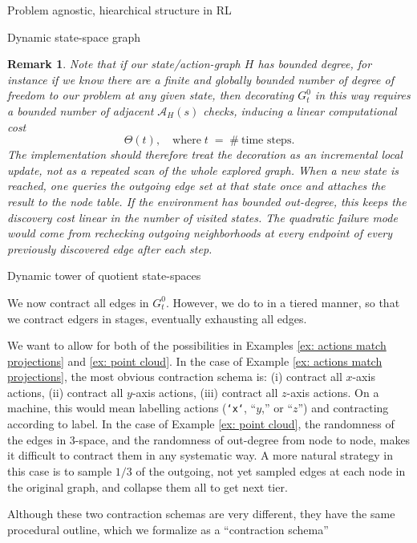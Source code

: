 \documentclass[11pt]{article}
\newtheorem{remark}[subsubsection]{Remark}
\begin{document}
\begin{section}{Problem agnostic, hiearchical structure in RL}
\begin{subsection}{Dynamic state-space graph}
\begin{remark}
\normalfont
Note that if our state/action-graph $H$ has bounded degree, for instance if we know there are a finite and globally bounded number of degree of freedom to our problem at any given state, then decorating $G^{0}_{t}$ in this way requires a bounded number of adjacent $\mathcal{A}_{H}(s)$ checks, inducing a linear computational cost
$$
\Theta(t),\quad\text{where}\;t\;=\;\#\ \text{time steps}.
$$
The implementation should therefore treat the decoration as an incremental local update, not as a repeated scan of the whole explored graph. When a new state is reached, one queries the outgoing edge set at that state once and attaches the result to the node table. If the environment has bounded out-degree, this keeps the discovery cost linear in the number of visited states. The quadratic failure mode would come from rechecking outgoing neighborhoods at every endpoint of every previously discovered edge after each step.
\end{remark}



\end{subsection}

\begin{subsection}{Dynamic tower of quotient state-spaces}

We now contract all edges in $G^{0}_{t}$. However, we do to in a tiered manner, so that we contract edgers in stages, eventually exhausting all edges. 

We want to allow for both of the possibilities in Examples \ref{ex: actions match projections} and \ref{ex: point cloud}. In the case of Example \ref{ex: actions match projections}, the most obvious contraction schema is: (i) contract all $x$-axis actions, (ii) contract all $y$-axis actions, (iii) contract all $z$-axis actions. On a machine, this would mean labelling actions (\texttt{`x`}, ``$y$,'' or ``$z$'') and contracting according to label. In the case of Example \ref{ex: point cloud}, the randomness of the edges in $3$-space, and the randomness of out-degree from node to node, makes it difficult to contract them in any systematic way. A more natural strategy in this case is to sample $1/3$ of the outgoing, not yet sampled edges at each node in the original graph, and collapse them all to get next tier.

Although these two contraction schemas are very different, they have the same procedural outline, which we formalize as a ``contraction schema''


\end{subsection}
\end{section}
\end{document}
